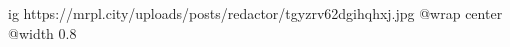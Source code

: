  
 
 
 
 

\ifcmt
  ig https://mrpl.city/uploads/posts/redactor/tgyzrv62dgihqhxj.jpg
  @wrap center
  @width 0.8
\fi

